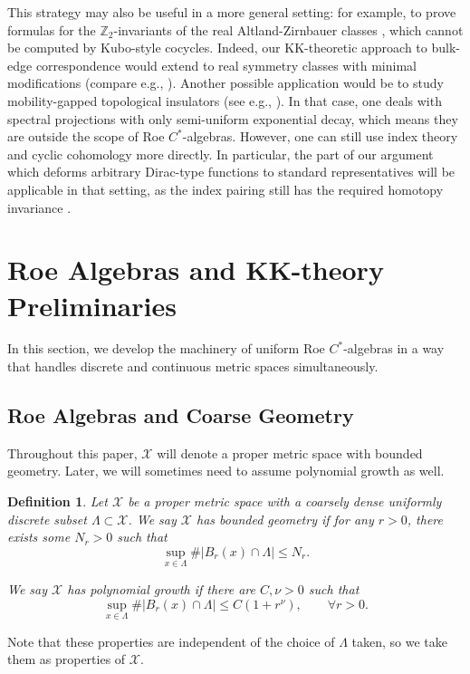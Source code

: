 \documentclass[12pt]{amsart}
\newtheorem{definition}[theorem]{Definition}
\newcommand{\ZM}{{\mathbb Z}}
\newcommand{\Xx}{{\mathcal X}}
\begin{document}
This strategy may also be useful in a more general setting: for example, to prove formulas for the $\ZM_2$-invariants of the real Altland-Zirnbauer classes  \cite{SchulzBaldes2015Z2, Drouot2026GeometricBulkEdge, Kitaev09}, which cannot be computed by Kubo-style cocycles. Indeed, our KK-theoretic approach to bulk-edge correspondence would extend to real symmetry classes with minimal modifications (compare e.g., \cite{AlldridgeMaxZirnbauer2020}). 
Another possible application would be to study mobility-gapped topological insulators (see e.g., \cite{BellissardVanElstSchulzBaldes1994, ProdanSchulzBaldes2016,ProdanSchulzBaldes2016Odd,Shapiro2020}). In that case, one deals with spectral projections with only semi-uniform exponential decay, which means they are outside the scope of Roe $C^*$-algebras. However, one can still use index theory and cyclic cohomology more directly. In particular, the part of our argument which deforms arbitrary Dirac-type functions to standard representatives will be applicable in that setting, as the index pairing still has the required homotopy invariance \cite{RichterSchulzBaldes2001, BolsSchenkerShapiro2023, Stoiber2025SpectralLocalizer}.

\section{Roe Algebras and KK-theory Preliminaries}
\label{sec:roe}

In this section, we develop the machinery of uniform Roe $C^*$-algebras in a way that handles discrete and continuous metric spaces simultaneously.

\subsection{Roe Algebras and Coarse Geometry}

Throughout this paper, $\Xx$ will denote a proper metric space with bounded geometry. Later, we will sometimes need to assume polynomial growth as well.
\begin{definition}
\label{def:poly_growth}
Let $\Xx$ be a proper metric space with a coarsely dense uniformly discrete subset $\Lambda\subset \Xx$.
We say $\Xx$ has bounded geometry if for any $r>0$, there exists some $N_r>0$ such that
\begin{equation}\label{eqn:bounded_geometry}
\sup_{x \in \Lambda} \#|B_r(x)\cap \Lambda| \leq N_r.
\end{equation}

We say $\Xx$ has polynomial growth if there are $C, \nu > 0$ such that
\begin{equation}\label{eqn:poly_growth}
\sup_{x \in \Lambda} \#|B_r(x)\cap \Lambda| \leq C (1+r^\nu), \qquad \forall r>0.
\end{equation}
\end{definition}
Note that these properties are independent of the choice of $\Lambda$ taken, so we take them as properties of $\Xx$.
\end{document}
